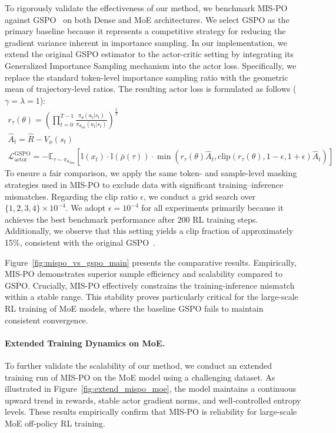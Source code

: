 To rigorously validate the effectiveness of our method, we benchmark MIS-PO against GSPO~\cite{zheng2025group} on both Dense and MoE architectures. We select GSPO as the primary baseline because it represents a competitive strategy for reducing the gradient variance inherent in importance sampling. In our implementation, we extend the original GSPO estimator to the actor-critic setting by integrating its Generalized Importance Sampling mechanism into the actor loss. Specifically, we replace the standard token-level importance sampling ratio with the geometric mean of trajectory-level ratios. The resulting actor loss is formulated as follows ($\gamma=\lambda=1$):
\begin{gather}
    r_\tau(\theta) = \left(\prod_{t=0}^{T-1}\frac{\pi_\theta(a_t|s_t)}{\pi_{\theta_\text{old}}(a_t|s_t)}\right)^{\frac 1T} \\
    \hat{A}_t = \hat{R} - V_\phi(s_t) \\
    \mathcal{L}^{\text{GSPO}}_\text{actor} = -\mathbb{E}_{\tau \sim \pi_{\theta_\text{vllm}}} \left[ \mathbb{I}(x_t) \cdot \mathbb{I}(\bar{\rho}(\tau)) \cdot  \min (r_\tau(\theta)\hat{A}_t, \text{clip}(r_\tau(\theta),1-\epsilon,1+\epsilon)\hat{A}_t) \right]
    \label{eq:gspo_loss}
\end{gather}
To ensure a fair comparison, we apply the same token- and sample-level masking strategies used in MIS-PO to exclude data with significant training–inference mismatches. Regarding the clip ratio $\epsilon$, we conduct a grid search over $\{1,2,3,4\}\times10^{-4}$. We adopt $\epsilon = 10^{-4}$ for all experiments primarily because it achieves the best benchmark performance after 200 RL training steps. Additionally, we observe that this setting yields a clip fraction of approximately 15\%, consistent with the original GSPO~\cite{zheng2025group}.

Figure~\ref{fig:mispo_vs_gspo_main} presents the comparative results. Empirically, MIS-PO demonstrates superior sample efficiency and scalability compared to GSPO. Crucially, MIS-PO effectively constrains the training-inference mismatch within a stable range. This stability proves particularly critical for the large-scale RL training of MoE models, where the baseline GSPO fails to maintain consistent convergence.

\paragraph{Extended Training Dynamics on MoE.}
To further validate the scalability of our method, we conduct an extended training run of MIS-PO on the MoE model using a challenging dataset. As illustrated in Figure~\ref{fig:extend_mispo_moe}, the model maintains a continuous upward trend in rewards, stable actor gradient norms, and well-controlled entropy levels. These results empirically confirm that MIS-PO is reliability for large-scale MoE off-policy RL training.

